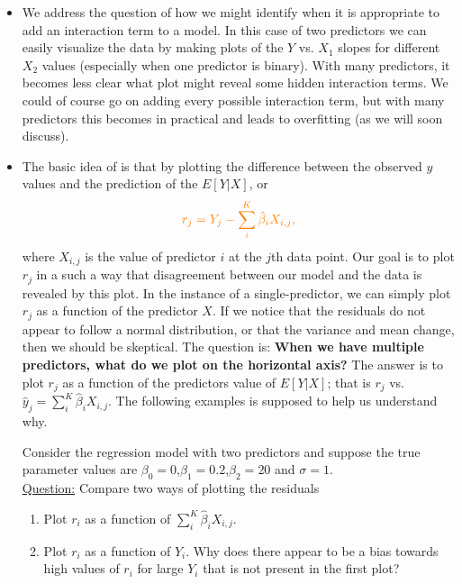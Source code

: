 \begin{itemize}
\item We address the question of how we might identify when it is appropriate to add an interaction term to a model. In this case of two predictors we can easily visualize the data by making plots of the $Y$ vs. $X_1$ slopes for different $X_2$ values (especially  when one predictor is binary). With many predictors, it becomes less clear what plot might reveal some hidden interaction terms. We could of course go on adding every possible interaction term, but with many predictors this becomes in practical and leads to overfitting (as we will soon discuss). 
\item The basic idea of  is that by plotting the difference between the observed $y$ values and the prediction of the $E[Y|X]$, or 
\begin{equation*}
\textcolor{orange}{r_j  = Y_j - \sum_i^{K}\hat{\beta}_iX_{i,j},}
\end{equation*}
where $X_{i,j}$ is the value of predictor $i$ at the $j$th data point. 
Our goal is to plot $r_j$ in a such a way that disagreement between our model and the data is revealed by this plot.  In the instance of a single-predictor, we can simply plot $r_j$ as a function of the predictor $X$. If we notice that the residuals do not appear to follow a normal distribution, or that the variance and mean change, then we should be skeptical.
 The question is: {\bf When we have multiple predictors, what do we plot on the horizontal axis?}   The answer is to plot $r_j$ as a function of the predictors value of $E[Y|X]$; that is $r_j$ vs. $\hat{y}_j = \sum_i^{K} \hat{\beta}_iX_{i,j}$. The following examples is supposed to help us understand why. 



%

\begin{example}\label{ex:res}

Consider the regression model with two predictors and suppose the true parameter values are $\beta_0=0$,$\beta_1 = 0.2$,$\beta_2 = 20$ and $\sigma = 1$. \\


\noindent
\underline{Question:} Compare two ways of plotting the residuals 
\begin{enumerate}[label=(\alph*)]
\item Plot $r_i$ as a function of $\sum_i^{K} \hat{\beta}_iX_{i,j}$. 
\item Plot $r_i$ as a function of $Y_i$. Why does there appear to be a bias towards high values of $r_i$ for large $Y_i$ that is not present in the first plot? \\
\end{enumerate}



\end{example}
\end{itemize}

